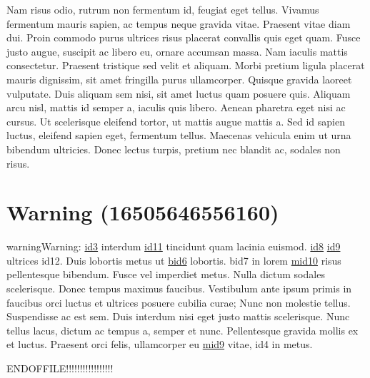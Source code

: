 \sphinxAtStartPar
Nam risus odio, rutrum non fermentum id, feugiat eget tellus. Vivamus fermentum mauris sapien, ac
tempus neque gravida vitae. Praesent vitae diam dui. Proin commodo purus ultrices risus placerat
convallis quis eget quam. Fusce justo augue, suscipit ac libero eu, ornare accumsan massa. Nam
iaculis mattis consectetur. Praesent tristique sed velit et aliquam. Morbi pretium ligula placerat
mauris dignissim, sit amet fringilla purus ullamcorper. Quisque gravida laoreet vulputate. Duis
aliquam sem nisi, sit amet luctus quam posuere quis. Aliquam arcu nisl, mattis id semper a, iaculis
quis libero. Aenean pharetra eget nisi ac cursus. Ut scelerisque eleifend tortor, ut mattis augue
mattis a. Sed id sapien luctus, eleifend sapien eget, fermentum tellus. Maecenas vehicula enim ut
urna bibendum ultricies. Donec lectus turpis, pretium nec blandit ac, sodales non risus.


\section{Warning (16505646556160)}
\label{\detokenize{test:warning-16505646556160}}
\begin{sphinxadmonition}{warning}{Warning:}
\sphinxAtStartPar
\hyperlink{\detokenize{id3}}{id3} interdum \hyperlink{\detokenize{id11}}{id11} tincidunt quam lacinia euismod.
\hyperlink{\detokenize{id8}}{id8} \hyperlink{\detokenize{id9}}{id9} ultrices \hypertarget{\detokenize{id12}}{id12}. Duis lobortis
metus ut \hyperlink{\detokenize{bid6}}{\hypertarget{\detokenize{bid6-ref46}}{bid6}} lobortis. \hypertarget{\detokenize{bid7}}{bid7} in lorem
\hyperlink{\detokenize{test-mid10-id0}}{\hypertarget{\detokenize{test-mid10-id1}}{mid10}} risus pellentesque bibendum. Fusce vel
imperdiet metus. Nulla dictum sodales scelerisque. Donec tempus maximus faucibus. Vestibulum ante
ipsum primis in faucibus orci luctus et ultrices posuere cubilia curae; Nunc non molestie tellus.
Suspendisse ac est sem. Duis interdum nisi eget justo mattis scelerisque. Nunc tellus lacus, dictum
ac tempus a, semper et nunc. Pellentesque gravida mollis ex et luctus. Praesent orci felis,
ullamcorper eu \hyperlink{\detokenize{test-mid9-id0}}{\hypertarget{\detokenize{test-mid9-id1}}{mid9}} vitae, \hypertarget{\detokenize{id4}}{id4} in metus.
\end{sphinxadmonition}

\sphinxAtStartPar
ENDOFFILE!!!!!!!!!!!!!!!!!

\sphinxstepscope



